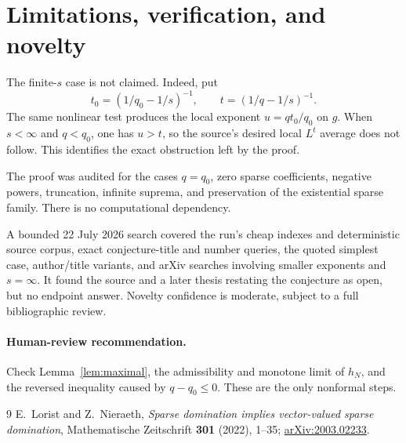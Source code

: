 \documentclass[11pt]{article}
\newcommand{\1}{\mathbf 1}
\begin{document}
\section{Limitations, verification, and novelty}

The finite-$s$ case is not claimed. Indeed, put
\[
 t_0=(1/q_0-1/s)^{-1},\qquad t=(1/q-1/s)^{-1}.
\]
The same nonlinear test produces the local exponent $u=qt_0/q_0$ on $g$.
When $s<\infty$ and $q<q_0$, one has $u>t$, so the source's desired local
$L^t$ average does not follow. This identifies the exact obstruction left by
the proof.

The proof was audited for the cases $q=q_0$, zero sparse coefficients,
negative powers, truncation, infinite suprema, and preservation of the
existential sparse family. There is no computational dependency.

A bounded 22 July 2026 search covered the run's cheap indexes and deterministic
source corpus, exact conjecture-title and number queries, the quoted simplest
case, author/title variants, and arXiv searches involving smaller exponents and
$s=\infty$. It found the source and a later thesis restating the conjecture as
open, but no endpoint answer. Novelty confidence is moderate, subject to a
full bibliographic review.

\paragraph{Human-review recommendation.}
Check Lemma~\ref{lem:maximal}, the admissibility and monotone limit of $h_N$,
and the reversed inequality caused by $q-q_0\le0$. These are the only
nonformal steps.

\begin{thebibliography}{9}
E.~Lorist and Z.~Nieraeth,
\emph{Sparse domination implies vector-valued sparse domination},
Mathematische Zeitschrift \textbf{301} (2022), 1--35;
\href{https://arxiv.org/abs/2003.02233}{arXiv:2003.02233}.
\end{thebibliography}
\end{document}
